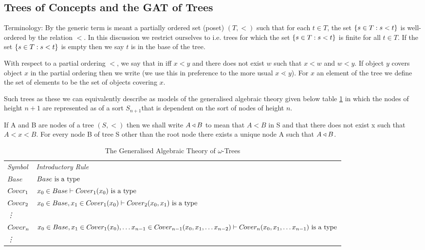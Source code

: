\subsection {Trees of Concepts and the GAT of Trees}



\note 
Terminology: By  the generic term  is meant a partially ordered set (poset) $(T, <)$ such that for each $t \in T$, the set $\left\{s \in T : s < t\right\}$ is well-ordered by the relation $<$.
In this discussion we restrict ourselves to  i.e. trees for which the set $\left\{s \in T : s < t\right\}$
is finite for all $t \in T$. If the set $\left\{s \in T : s < t\right\}$ is empty then we say $t$ is in the base of the tree.

With respect to a partial ordering $<$, we say that  in  iff $x<y$ and there does not exist $w$ such that $x < w$ and $w < y$.
If object $y$ covers object $x$ in the partial ordering 
then we write  (we use this in preference to the more usual $x \lessdot y$).
For $x$ an element of the tree we define the set of elements   to be the set of objects covering $x$.


Such trees as these we can equivalently describe as models of the generalised algebraic theory given below table \ref{GATOFTREES} in which the nodes of height $n+1$ are represented as of a sort $S_{n+1}$that is dependent on the sort of nodes of height $n$.

\newcommand{\Ft}[1]{\downarrow \kern -0.325em #1}
If A and B are nodes of  a tree $(S,<)$ then we shall write $A \triangleleft B$ to mean that $A < B$ in S and that
there does not exist x such that $A < x < B$. For every node B of tree S other than the root node there exists a unique node A such that $A \triangleleft B$.

\newcommand{\Sz}{Base}
\newcommand{\ofS}[1]{\ofT{#1}{\Sz}}
\newcommand{\Si}[1]{C\kern-1pt over_{#1}}
\newcommand{\ofSi}[3]{\ofT{#1}{\Si{#2}(#3)}}
\vspace{0.03cm} 
\begin{table}[H]
\caption{The Generalised Algebraic Theory of $\omega$-Trees}
\label{GATOFTREES}
\begin{tabular}{>{\itshape}l l}
Symbol & \itshape{Introductory Rule} \\
$\Sz  $&$\isT{\Sz}$\\
$\Si{1} $&$\ofS{x_0} \tstyle \isT{\Si{1}(x_0)} $\\
$\Si{2} $&$\ofS{x_0},\ofSi{x_1}{1}{x_0} \tstyle \isT{\Si{2}(x_0,x_1)} $\\
\vdots  \\
$\Si{n} $&$\ofS{x_0},\ofSi{x_1}{1}{x_0}, \hdots \ofSi{x_{n-1}}{n-1}{x_0,x_1,\hdots x_{n-2}} \tstyle \isT{\Si{n}(x_0,x_1,\hdots x_{n-1})} $\\
\vdots   \\
\end{tabular} \\
\end{table} 


